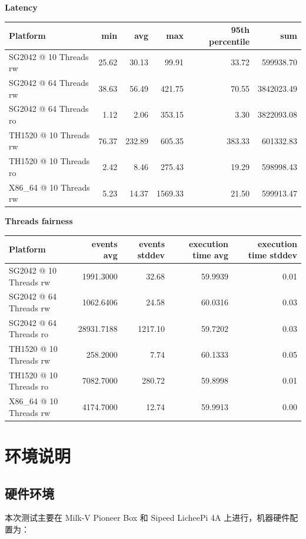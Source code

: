 \documentclass{article}
\begin{document}
\textbf{Latency}

\begin{table}[H]
\centering
\begin{tabular}{|l|r|r|r|r|r|}
\hline
Platform & min & avg & max & 95th percentile & sum \\
\hline
SG2042 @ 10 Threads rw & 25.62 & 30.13 & 99.91 & 33.72 & 599938.70 \\
SG2042 @ 64 Threads rw & 38.63 & 56.49 & 421.75 & 70.55 & 3842023.49 \\
SG2042 @ 64 Threads ro & 1.12 & 2.06 & 353.15 & 3.30 & 3822093.08 \\
TH1520 @ 10 Threads rw & 76.37 & 232.89 & 605.35 & 383.33 & 601332.83 \\
TH1520 @ 10 Threads ro & 2.42 & 8.46 & 275.43 & 19.29 & 598998.43 \\
X86\_64 @ 10 Threads rw & 5.23 & 14.37 & 1569.33 & 21.50 & 599913.47 \\
\hline
\end{tabular}
\end{table}

\textbf{Threads fairness}

\begin{table}[H]
\centering
\begin{tabular}{|l|r|r|r|r|}
\hline
Platform & events avg & events stddev & execution time avg & execution time stddev \\
\hline
SG2042 @ 10 Threads rw & 1991.3000 & 32.68 & 59.9939 & 0.01 \\
SG2042 @ 64 Threads rw & 1062.6406 & 24.58 & 60.0316 & 0.03 \\
SG2042 @ 64 Threads ro & 28931.7188 & 1217.10 & 59.7202 & 0.03 \\
TH1520 @ 10 Threads rw & 258.2000 & 7.74 & 60.1333 & 0.05 \\
TH1520 @ 10 Threads ro & 7082.7000 & 280.72 & 59.8998 & 0.01 \\
X86\_64 @ 10 Threads rw & 4174.7000 & 12.74 & 59.9913 & 0.00 \\
\hline
\end{tabular}
\end{table}

\section{环境说明}

\subsection{硬件环境}
本次测试主要在 Milk-V Pioneer Box 和 Sipeed LicheePi 4A 上进行，机器硬件配置为：
\end{document}
